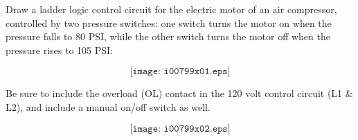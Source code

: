

Draw a ladder logic control circuit for the electric motor of an air compressor, controlled by two pressure switches: one switch turns the motor on when the pressure falls to 80 PSI, while the other switch turns the motor off when the pressure rises to 105 PSI:

$$\texttt{[image: i00799x01.eps]}$$

Be sure to include the overload (OL) contact in the 120 volt control circuit (L1 \& L2), and include a manual on/off switch as well.







$$\texttt{[image: i00799x02.eps]}$$











